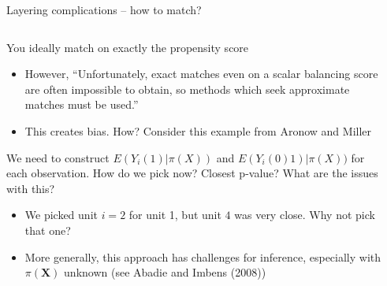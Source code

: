 \documentclass[notes,11pt, aspectratio=169]{beamer}
\newenvironment{wideitemize}{\itemize\addtolength{\itemsep}{10pt}}{\enditemize}
\begin{document}
\begin{frame}{Layering complications -- how to match?}
\begin{columns}[T] %
\begin{column}{.55\textwidth}
  \begin{wideitemize}
  \item<1-> You ideally match on exactly the propensity score
    \begin{itemize}
    \item However, ``Unfortunately, exact matches even on a scalar balancing score are often impossible to obtain, so methods which seek approximate matches must be used.''
    \item This creates bias. How? Consider this example from Aronow and Miller
    \end{itemize}
  \item<2-> We need to construct $E(Y_{i}(1) | \pi(X)) $ and
    $E(Y_{i}(0) 1) | \pi(X))$ for each observation. How do we pick now?
    Closest p-value? What are the issues with this?
    \begin{itemize}
    \item We picked unit $i = 2$ for unit 1, but unit $4$ was very
      close. Why not pick that one?
    \item More generally, this approach has challenges for inference,
      especially with $\pi(\mathbf{X})$ unknown (see Abadie and Imbens
      (2008))
    \end{itemize}
  \end{wideitemize}
\end{column}%
\hfill%
\begin{column}{.5\textwidth}
  \small
\end{column}
\end{columns}
\end{frame}
\end{document}
